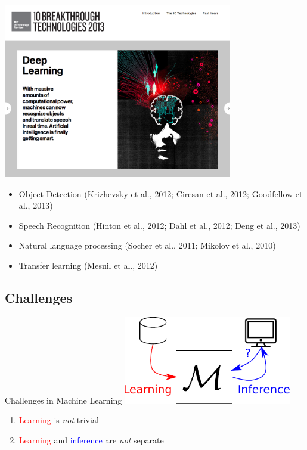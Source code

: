 \documentclass{beamer}
\newcommand{\tred}[1]{\textcolor{red}{#1}}
\newcommand{\tblue}[1]{\textcolor{blue}{#1}}
\begin{document}
\begin{frame}

\centering
\includegraphics[width=0.75\textwidth]{mit_breakthrough_deepl.png}

{\small
\begin{itemize}
\itemsep 0em
\item  Object Detection {\scriptsize (Krizhevsky et al., 2012; Ciresan et al., 2012; Goodfellow et al., 2013)} 
\item Speech Recognition {\scriptsize (Hinton et al., 2012; Dahl et al., 2012; Deng
        et al., 2013)} 
\item Natural language processing {\scriptsize (Socher et al., 2011; Mikolov et al., 2010)} 
\item Transfer learning {\scriptsize (Mesnil et al., 2012)}
\end{itemize}
}

\end{frame}

\subsection{Challenges}

\begin{frame}{Challenges in Machine Learning}
    \centering
    \includegraphics[width=0.55\textwidth]{machinelearning.pdf}

    \vspace{4mm}
    \raggedright
    \begin{enumerate}
        \item \tred{Learning} is \emph{not} trivial 
        \item \tred{Learning} and \tblue{inference} are \emph{not} separate
    \end{enumerate}
\end{frame}
\end{document}
